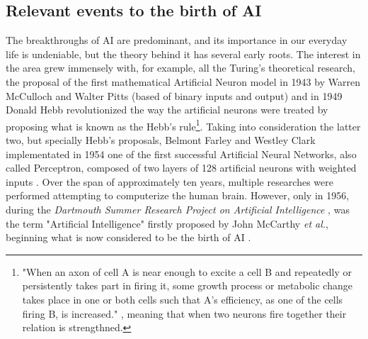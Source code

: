 \documentclass[12pt]{article}
\begin{document}
\subsection{Relevant events to the birth of AI}
\par The breakthroughs of AI are predominant, and its importance in our everyday life is undeniable, but the theory behind it has several early roots. The interest in the area grew immensely with, for example, all the Turing's theoretical research, the proposal of the first mathematical Artificial Neuron model in 1943 by Warren McCulloch and Walter Pitts (based of binary inputs and output) \autocite{mccullochLOGICALCALCULUSIDEAS} and in 1949 Donald Hebb revolutionized the way the artificial neurons were treated by proposing what is known as the Hebb's rule\footnote{"When an axon of cell A is near enough to excite a cell B and repeatedly or persistently takes part in firing it, some growth process or metabolic change takes place in one or both cells such that A’s efficiency, as one of the cells firing B, is increased." \autocite{hebbOrganizationBehaviorNeuropsychological1949}, meaning that when two neurons fire together their relation is strengthned.}. Taking into consideration the latter two, but specially Hebb's proposals, Belmont Farley and Westley Clark implementated in 1954 one of the first successful Artificial Neural Networks, also called Perceptron, composed of two layers of 128 artificial neurons with weighted inputs \autocite{farleySimulationSelforganizingSystems1954}. Over the span of approximately ten years, multiple researches were performed attempting to computerize the human brain. However, only in 1956, during the \textit{Dartmouth Summer Research Project on Artificial Intelligence} \autocite{mccarthyPROPOSALDARTMOUTHSUMMER}, was the term "Artificial Intelligence" firstly proposed by John McCarthy \textit{et al.}, beginning what is now considered to be the birth of AI \autocite{zhangStudyArtificialIntelligence2021}.  
\end{document}
